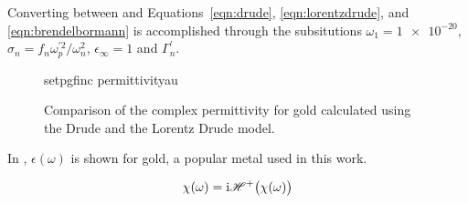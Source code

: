 Converting between  and
Equations~\ref{eqn:drude}, \ref{eqn:lorentzdrude}, and
\ref{eqn:brendelbormann} is accomplished through the subsitutions $\omega_1
= \num{1e-20}$, $\sigma_n = {f_n \omega_p^{\prime 2}}/{\omega_n^2}$,
$\epsilon_\infty=1$ and $\Gamma_n^\prime$.

\begin{figure}[ht]
\centering
{setpgfinc}
{permittivityau}
\caption{Comparison of the complex permittivity for gold calculated using the Drude
and the Lorentz Drude model.}
\label{fig:permittivityau}
\end{figure}

In , $\epsilon(\omega)$ is shown for gold, a
popular metal used in this work.  

\begin{align}
\chi(\omega)={\mathrm{i}} {\mathscr{H}^{+}\bigl(\chi(\omega)\bigr)}
\end{align}
